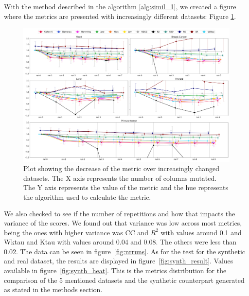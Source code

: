 


With the method described in the algorithm \ref{alg:simil_1}, we created a figure where the metrics are presented with increasingly different datasets: Figure \ref{fig:lineplot}.

\begin{landscape}

\begin{figure}[htbp]
\centering
\caption{Plot showing the decrease of the metric over increasingly changed datasets. The X axis represents the number of columns mutated. The Y axis represents the value of the metric and the hue represents the algorithm used to calculate the metric.}\label{fig:lineplot} 
\includegraphics[scale=0.40]{figures/multiple_datasets_2.png}
\end{figure}
\end{landscape}

We also checked to see if the number of repetitions and how that impacts the variance of the scores. We found out that variance was low across most metrics, being the ones with higher variance was CC and $R^2$ with values around 0.1 and Wktau and Ktau with values around 0.04 and 0.08. The others were less than 0.02. The data can be seen in figure~\ref{fig:nrruns}. As for the test for the synthetic and real dataset, the results are displayed in figure~\ref{fig:synth_result}. Values available in figure~\ref{fig:synth_heat}. This is the metrics distribution for the comparison of the 5 mentioned datasets and the synthetic counterpart generated as stated in the methods section.





